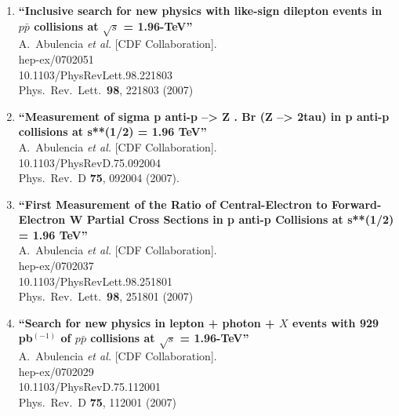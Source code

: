 \documentclass{article}
\begin{document}
\begin{enumerate}
\item%
{\bf ``Inclusive search for new physics with like-sign dilepton events in $p \bar{p}$ collisions at $\sqrt{s}$ = 1.96-TeV''}
  \\{}A.~Abulencia {\it et al.}  [CDF Collaboration].
  \\{}hep-ex/0702051
    \\{}10.1103/PhysRevLett.98.221803
\\{}Phys.\ Rev.\ Lett.\  {\bf 98}, 221803 (2007) %


\item%
{\bf ``Measurement of sigma p anti-p --> Z . Br (Z --> 2tau) in p anti-p collisions at s**(1/2) = 1.96 TeV''}
  \\{}A.~Abulencia {\it et al.}  [CDF Collaboration].
    \\{}10.1103/PhysRevD.75.092004
\\{}Phys.\ Rev.\ D {\bf 75}, 092004 (2007). %


\item%
{\bf ``First Measurement of the Ratio of Central-Electron to Forward-Electron W Partial Cross Sections in p anti-p Collisions at s**(1/2) = 1.96 TeV''}
  \\{}A.~Abulencia {\it et al.}  [CDF Collaboration].
  \\{}hep-ex/0702037
    \\{}10.1103/PhysRevLett.98.251801
\\{}Phys.\ Rev.\ Lett.\  {\bf 98}, 251801 (2007) %


\item%
{\bf ``Search for new physics in lepton + photon + $X$ events with 929 pb$^{(-1)}$ of $p \bar{p}$ collisions at $\sqrt{s}$ = 1.96-TeV''}
  \\{}A.~Abulencia {\it et al.}  [CDF Collaboration].
  \\{}hep-ex/0702029
    \\{}10.1103/PhysRevD.75.112001
\\{}Phys.\ Rev.\ D {\bf 75}, 112001 (2007) %



\end{enumerate}
\end{document}
